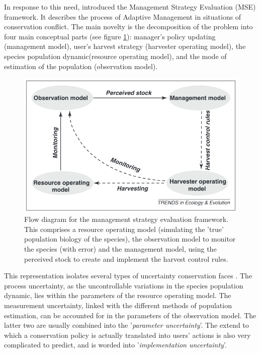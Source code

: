 \documentclass[12pt,a4paper]{article}
\begin{document}
In response to this need, \cite{BUNNEFELD2011441} introduced the Management Strategy Evaluation (MSE) framework.
It describes the process of Adaptive Management in situations of conservation conflict.
The main novelty is the decomposition of the problem into four main conceptual parts (see figure \ref{msediagram}): manager's policy updating (management model), user's harvest strategy (harvester operating model), the species population dynamic(resource operating model), and the mode of estimation of the population (observation model).
\begin{figure}
	\centering
	\includegraphics[scale=0.5]{msediagram.png}
	\caption{Flow diagram for the management strategy evaluation framework. This comprises a resource operating model (simulating the 'true' population biology of the species), the observation model to monitor the species (with error) and the management model, using the perceived stock to create and implement the harvest control rules. \citep{BUNNEFELD2011441}}
	\label{msediagram}
\end{figure}
This representation isolates several types of uncertainty conservation faces \citep{BUNNEFELD2011441}.
The process uncertainty, as the uncontrollable variations in the species population dynamic, lies within the parameters of the resource operating model.
The measurement uncertainty, linked with the different methods of population estimation, can be accounted for in the parameters of the observation model.
The latter two are usually combined into the '\textit{parameter uncertainty}'.
The extend to which a conservation policy is actually translated into users' actions is also very complicated to predict, and is worded into '\textit{implementation uncertainty}'.
\end{document}
